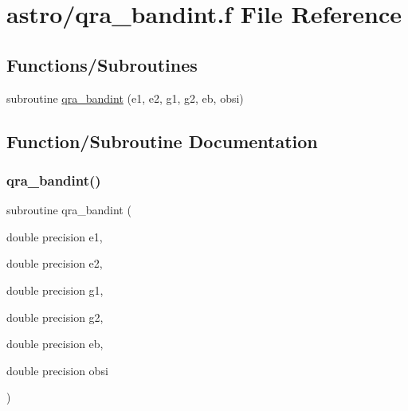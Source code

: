 \hypertarget{qra__bandint_8f}{}\section{astro/qra\+\_\+bandint.f File Reference}
\label{qra__bandint_8f}
\subsection*{Functions/\+Subroutines}
\begin{DoxyCompactItemize}
\item 
subroutine \hyperlink{qra__bandint_8f_a2ccaa1b05a4afc6272ab965a165f53f0}{qra\+\_\+bandint} (e1, e2, g1, g2, eb, obsi)
\end{DoxyCompactItemize}


\subsection{Function/\+Subroutine Documentation}
\mbox{\label{qra__bandint_8f_a2ccaa1b05a4afc6272ab965a165f53f0}} 
\subsubsection{\texorpdfstring{qra\+\_\+bandint()}{qra\_bandint()}}
{\footnotesize\ttfamily subroutine qra\+\_\+bandint (\begin{DoxyParamCaption}\item[{double precision}]{e1,  }\item[{double precision}]{e2,  }\item[{double precision}]{g1,  }\item[{double precision}]{g2,  }\item[{double precision}]{eb,  }\item[{double precision}]{obsi }\end{DoxyParamCaption})}

